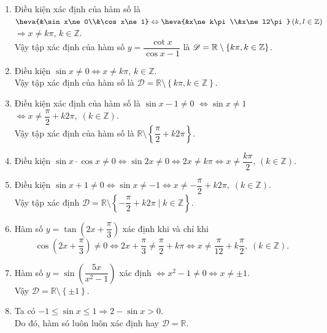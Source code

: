 \begin{ex}
{\begin{enumerate}
			Vậy $\mathscr{D}=\mathbb{R} \setminus \left\{k\pi, k\in \mathbb{Z}\right\}$. 
			\item Điều kiện xác định của hàm số là $\heva{&\sin x\ne 0\\&\cos x\ne 1}\Leftrightarrow \heva{&x\ne k\pi\\&x\ne l2\pi} \left(k,l\in {\bf \mathbb{Z}}\right)$ $\Rightarrow  x\ne k\pi$, $ k\in \mathbb{Z}$.\\
			Vậy tập xác định của hàm số $y=\dfrac{\cot x}{\cos  x-1}$ là $\mathscr{D}=\mathbb{R}\setminus \left\{k\pi, k\in {\bf \mathbb{Z}}\right\}$.
			\item Điều kiện  $\sin x\ne 0\Leftrightarrow x\ne k\pi$, $ k\in \mathbb{Z}$. \\
			Vậy tập xác định của hàm số là $\mathscr{D}=\mathbb{R}\setminus  \left\{k\pi, k\in\mathbb{Z}\right\}$.
			 \item Điều kiện xác định của hàm số là $\sin x-1\ne 0$ $\Leftrightarrow \sin x\ne 1$ $\Leftrightarrow x\ne \dfrac{\pi}{2}+k2\pi,\; \left(k\in \mathbb{Z}\right)$.\\
			Vậy tập xác  định của hàm số là $\mathbb{R}\setminus \left\{\dfrac{\pi}{2}+k2\pi \right\}$.
			\item Điều kiện $\sin x\cdot\cos  x\ne 0\Leftrightarrow \sin 2x\ne 0\Leftrightarrow 2x\ne k\pi \Leftrightarrow x\ne \dfrac{k\pi}{2}$, $\left(k\in \mathbb{Z}\right)$.
			\item Điều kiện $\sin x+1\neq 0\Leftrightarrow \sin x\neq -1\Leftrightarrow x\neq-\dfrac{\pi}{2}+k2\pi,\;  \left(k\in \mathbb{Z}\right)$.\\
			Vậy  tập xác định $\mathscr{D}=\mathbb{R}\setminus\left\{-\dfrac{\pi}{2}+k2\pi\mid k\in \mathbb{Z}\right\}$.
			\item Hàm số $y=\tan \left(2x+\dfrac{\pi}{3} \right)$ xác định khi và chỉ khi 
			\[\cos \left(2x+\dfrac{\pi}{3} \right)\ne  0\Leftrightarrow 2x+\dfrac{\pi}{3} \ne \dfrac{\pi}{2}+k\pi \Leftrightarrow x\ne \dfrac{\pi}{12}+k\dfrac{\pi}{2},\; \left(k\in \mathbb{Z}\right).
			 \]
			\item Hàm số $y=\sin \left(\dfrac{5x}{x^2-1} \right)$ xác định $\Leftrightarrow x^2-1\ne 0\Leftrightarrow  x\ne \pm 1$. \\
			Vậy $\mathscr{D}=\mathbb{R}\setminus  \left\{\pm 1\right\}$.
			\item Ta có $-1\le \sin  x\le 1\Rightarrow 2-\sin x > 0$. \\
			Do đó, hàm só luôn luôn xác định  hay $\mathscr{D}=\mathbb{R}$.
		\end{enumerate}
	} 
\end{ex}

